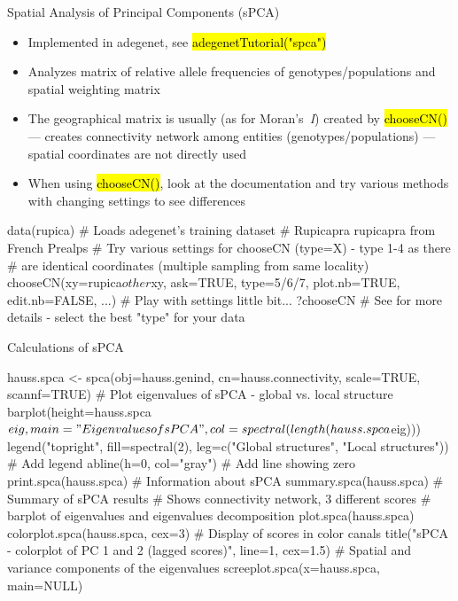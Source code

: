 \documentclass[compress, ucs, xelatex, 11pt, xcolor=svgnames,
  hyperref={
    bookmarks=true,
    unicode=true,
    colorlinks=true,
    pdftitle={Molecular data in R},
    plainpages=false,
    pdfauthor={Vojtech Zeisek},
    pdfsubject={Course about phylogeny and evolution in R},
    pdfcreator={XeLaTeX},
    pdfkeywords={R, evolution, phylogeny, molecular data},
    linkcolor=Tomato,
    anchorcolor=SaddleBrown,
    citecolor=Goldenrod,
    filecolor=DarkMagenta,
    menucolor=Sienna,
    urlcolor=DarkTurquoise,
    pdftex},
  url={hyphens, lowtilde} %
  ]{beamer}
\renewcommand{\texttt}[1]{\hl{\ttfamily #1}}
\begin{document}
\begin{frame}[fragile]{Spatial Analysis of Principal Components (sPCA)}
  \begin{itemize}
    \item Implemented in adegenet, see \texttt{adegenetTutorial("spca")}
    \item Analyzes matrix of relative allele frequencies of genotypes/populations and spatial weighting matrix
    \item The geographical matrix is usually (as for Moran's~\textit{I}) created by \texttt{chooseCN()} --- creates connectivity network among entities (genotypes/populations) --- spatial coordinates are not directly used
    \item When using \texttt{chooseCN()}, look at the documentation and try various methods with changing settings to see differences
  \end{itemize}
  \begin{spluscode}
    data(rupica) # Loads adegenet's training dataset
                 # Rupicapra rupicapra from French Prealps
    # Try various settings for chooseCN (type=X) - type 1-4 as there
    # are identical coordinates (multiple sampling from same locality)
    chooseCN(xy=rupica$other$xy, ask=TRUE, type=5/6/7, plot.nb=TRUE,
      edit.nb=FALSE, ...) # Play with settings little bit...
    ?chooseCN # See for more details - select the best "type" for your data
  \end{spluscode}
\end{frame}

\begin{frame}[fragile]{Calculations of sPCA}
  \begin{spluscode}
    hauss.spca <- spca(obj=hauss.genind, cn=hauss.connectivity,
      scale=TRUE, scannf=TRUE)
    # Plot eigenvalues of sPCA - global vs. local structure
    barplot(height=hauss.spca$eig, main="Eigenvalues of sPCA",
      col=spectral(length(hauss.spca$eig)))
    legend("topright", fill=spectral(2), leg=c("Global structures",
      "Local structures")) # Add legend
    abline(h=0, col="gray") # Add line showing zero
    print.spca(hauss.spca) # Information about sPCA
    summary.spca(hauss.spca) # Summary of sPCA results
    # Shows connectivity network, 3 different scores
    # barplot of eigenvalues and eigenvalues decomposition
    plot.spca(hauss.spca)
    colorplot.spca(hauss.spca, cex=3) # Display of scores in color canals
    title("sPCA - colorplot of PC 1 and 2 (lagged scores)", line=1, cex=1.5)
    # Spatial and variance components of the eigenvalues
    screeplot.spca(x=hauss.spca, main=NULL)
  \end{spluscode}
\end{frame}
\end{document}
